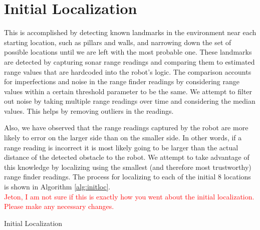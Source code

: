 \documentclass[12pt]{article}
\begin{document}
\section{Initial Localization}

This is accomplished by detecting known landmarks in the environment near each starting location, such as pillars and walls, and narrowing down the set of possible locations until we are left with the most probable one. These landmarks are detected by capturing sonar range readings and comparing them to estimated range values that are hardcoded into the robot's logic. The comparison accounts for imperfections and noise in the range finder readings by considering range values within a certain threshold parameter to be the same. We attempt to filter out noise by taking multiple range readings over time and considering the median values. This helps by removing outliers in the readings. 

Also, we have observed that the range readings captured by the robot are more likely to error on the larger side than on the smaller side. In other words, if a range reading is incorrect it is most likely going to be larger than the actual distance of the detected obstacle to the robot. We attempt to take advantage of this knowledge by localizing using the smallest (and therefore most trustworthy) range finder readings. The process for localizing to each of the initial 8 locations is shown in Algorithm \ref{alg:initloc}. \\

\textcolor{red}{Jeton, I am not sure if this is exactly how you went about the initial localization. Please make any necessary changes.}


\begin{algorithm}[H]
\caption{Initial Localization}
\label{alg:initloc}
\begin{algorithmic}[1]

\ELSE 
	\ELSE
			\ELSE
			\ENDIF
		\ELSE
			\ELSE
				\ELSE 
				\ENDIF
			\ENDIF
		\ENDIF
	\ENDIF
\ENDIF

\end{algorithmic}
\end{algorithm}
\end{document}
